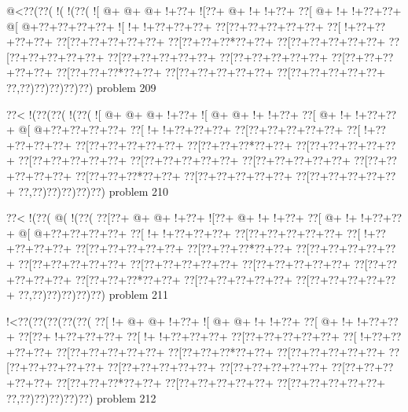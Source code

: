 \vbox{\vbox{\goo
\- @<\0??(\0??(\- !(\- !(\0??(
\- ![\- @+\- @+\- @+\- !+\0??+
\- ![\0??+\- @+\- !+\- !+\0??+
\0??[\- @+\- !+\- !+\0??+\0??+
\- @[\- @+\0??+\0??+\0??+\0??+
\- ![\- !+\- !+\0??+\0??+\0??+
\0??[\0??+\0??+\0??+\0??+\0??+
\0??[\- !+\0??+\0??+\0??+\0??+
\0??[\0??+\0??+\0??+\0??+\0??+
\0??[\0??+\0??+\0??*\0??+\0??+
\0??[\0??+\0??+\0??+\0??+\0??+
\0??[\0??+\0??+\0??+\0??+\0??+
\0??[\0??+\0??+\0??+\0??+\0??+
\0??[\0??+\0??+\0??+\0??+\0??+
\0??[\0??+\0??+\0??+\0??+\0??+
\0??[\0??+\0??+\0??*\0??+\0??+
\0??[\0??+\0??+\0??+\0??+\0??+
\0??[\0??+\0??+\0??+\0??+\0??+
\0??,\0??)\0??)\0??)\0??)\0??)
}
\hfil problem 209\hfil\break
}

\vbox{\vbox{\goo
\0??<\- !(\0??(\0??(\- !(\0??(
\- ![\- @+\- @+\- @+\- !+\0??+
\- ![\- @+\- @+\- !+\- !+\0??+
\0??[\- @+\- !+\- !+\0??+\0??+
\- @[\- @+\0??+\0??+\0??+\0??+
\0??[\- !+\- !+\0??+\0??+\0??+
\0??[\0??+\0??+\0??+\0??+\0??+
\0??[\- !+\0??+\0??+\0??+\0??+
\0??[\0??+\0??+\0??+\0??+\0??+
\0??[\0??+\0??+\0??*\0??+\0??+
\0??[\0??+\0??+\0??+\0??+\0??+
\0??[\0??+\0??+\0??+\0??+\0??+
\0??[\0??+\0??+\0??+\0??+\0??+
\0??[\0??+\0??+\0??+\0??+\0??+
\0??[\0??+\0??+\0??+\0??+\0??+
\0??[\0??+\0??+\0??*\0??+\0??+
\0??[\0??+\0??+\0??+\0??+\0??+
\0??[\0??+\0??+\0??+\0??+\0??+
\0??,\0??)\0??)\0??)\0??)\0??)
}
\hfil problem 210\hfil\break
}

\vbox{\vbox{\goo
\0??<\- !(\0??(\- @(\- !(\0??(
\0??[\0??+\- @+\- @+\- !+\0??+
\- ![\0??+\- @+\- !+\- !+\0??+
\0??[\- @+\- !+\- !+\0??+\0??+
\- @[\- @+\0??+\0??+\0??+\0??+
\0??[\- !+\- !+\0??+\0??+\0??+
\0??[\0??+\0??+\0??+\0??+\0??+
\0??[\- !+\0??+\0??+\0??+\0??+
\0??[\0??+\0??+\0??+\0??+\0??+
\0??[\0??+\0??+\0??*\0??+\0??+
\0??[\0??+\0??+\0??+\0??+\0??+
\0??[\0??+\0??+\0??+\0??+\0??+
\0??[\0??+\0??+\0??+\0??+\0??+
\0??[\0??+\0??+\0??+\0??+\0??+
\0??[\0??+\0??+\0??+\0??+\0??+
\0??[\0??+\0??+\0??*\0??+\0??+
\0??[\0??+\0??+\0??+\0??+\0??+
\0??[\0??+\0??+\0??+\0??+\0??+
\0??,\0??)\0??)\0??)\0??)\0??)
}
\hfil problem 211\hfil\break
}

\vbox{\vbox{\goo
\- !<\0??(\0??(\0??(\0??(\0??(
\0??[\- !+\- @+\- @+\- !+\0??+
\- ![\- @+\- @+\- !+\- !+\0??+
\0??[\- @+\- !+\- !+\0??+\0??+
\0??[\0??+\- !+\0??+\0??+\0??+
\0??[\- !+\- !+\0??+\0??+\0??+
\0??[\0??+\0??+\0??+\0??+\0??+
\0??[\- !+\0??+\0??+\0??+\0??+
\0??[\0??+\0??+\0??+\0??+\0??+
\0??[\0??+\0??+\0??*\0??+\0??+
\0??[\0??+\0??+\0??+\0??+\0??+
\0??[\0??+\0??+\0??+\0??+\0??+
\0??[\0??+\0??+\0??+\0??+\0??+
\0??[\0??+\0??+\0??+\0??+\0??+
\0??[\0??+\0??+\0??+\0??+\0??+
\0??[\0??+\0??+\0??*\0??+\0??+
\0??[\0??+\0??+\0??+\0??+\0??+
\0??[\0??+\0??+\0??+\0??+\0??+
\0??,\0??)\0??)\0??)\0??)\0??)
}
\hfil problem 212\hfil\break
}

